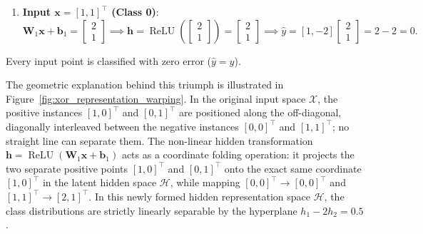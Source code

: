 \begin{enumerate}[noitemsep,topsep=2pt,parsep=0pt,partopsep=0pt]
\begin{equation}
    \end{equation}
  \item \textbf{Input $\mathbf{x} = [1, 1]^\top$ (Class 0)}:
    \begin{equation}
    \mathbf{W}_1 \mathbf{x} + \mathbf{b}_1 = \begin{bmatrix} 2 \\ 1 \end{bmatrix} \implies \mathbf{h} = \operatorname{ReLU}\left(\begin{bmatrix} 2 \\ 1 \end{bmatrix}\right) = \begin{bmatrix} 2 \\ 1 \end{bmatrix} \implies \hat{y} = [1, -2] \begin{bmatrix} 2 \\ 1 \end{bmatrix} = 2 - 2 = 0.
    \end{equation}
\end{enumerate}
Every input point is classified with zero error ($\hat{y} = y$).

The geometric explanation behind this triumph is illustrated in Figure~\ref{fig:xor_representation_warping}. In the original input space $\mathcal{X}$, the positive instances $[1, 0]^\top$ and $[0, 1]^\top$ are positioned along the off-diagonal, diagonally interleaved between the negative instances $[0, 0]^\top$ and $[1, 1]^\top$; no straight line can separate them. The non-linear hidden transformation $\mathbf{h} = \operatorname{ReLU}(\mathbf{W}_1 \mathbf{x} + \mathbf{b}_1)$ acts as a coordinate folding operation: it projects the two separate positive points $[1, 0]^\top$ and $[0, 1]^\top$ onto the exact same coordinate $[1, 0]^\top$ in the latent hidden space $\mathcal{H}$, while mapping $[0, 0]^\top \to [0, 0]^\top$ and $[1, 1]^\top \to [2, 1]^\top$. In this newly formed hidden representation space $\mathcal{H}$, the class distributions are strictly linearly separable by the hyperplane $h_1 - 2h_2 = 0.5$.

